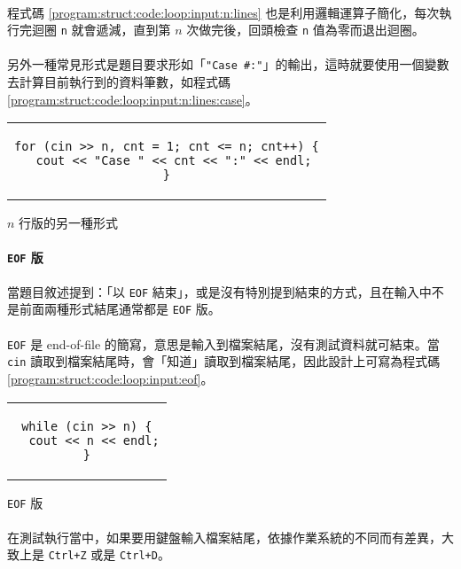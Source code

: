 \documentclass[12pt,a4paper,oneside]{article}
\begin{document}
\begin{CJK}{UTF8}{bkai}
\paragraph{}程式碼 \ref{program:struct:code:loop:input:n:lines} 也是利用邏輯運算子簡化，每次執行完迴圈 \lstinline!n! 就會遞減，直到第 $n$ 次做完後，回頭檢查 \lstinline!n! 值為零而退出迴圈。
\paragraph{}另外一種常見形式是題目要求形如「\lstinline!"Case #:"!」的輸出，這時就要使用一個變數去計算目前執行到的資料筆數，如程式碼 \ref{program:struct:code:loop:input:n:lines:case}。

\begin{code}[h!]
\centering
\begin{tabular}{c}
\begin{lstlisting}
for (cin >> n, cnt = 1; cnt <= n; cnt++) {
  cout << "Case " << cnt << ":" << endl;
}
\end{lstlisting}
\end{tabular}
\caption{$n$ 行版的另一種形式}
\label{program:struct:code:loop:input:n:lines:case}
\end{code}

\paragraph{\texttt{EOF} 版}當題目敘述提到：「以 \texttt{EOF} 結束」，或是沒有特別提到結束的方式，且在輸入中不是前面兩種形式結尾通常都是 \texttt{EOF} 版。
\paragraph{}\texttt{EOF} 是 end-of-file 的簡寫，意思是輸入到檔案結尾，沒有測試資料就可結束。當 \lstinline!cin! 讀取到檔案結尾時，會「知道」讀取到檔案結尾，因此設計上可寫為程式碼 \ref{program:struct:code:loop:input:eof}。

\begin{code}[h!]
\centering
\begin{tabular}{c}
\begin{lstlisting}
while (cin >> n) {
  cout << n << endl;
}
\end{lstlisting}
\end{tabular}
\caption{\texttt{EOF} 版}
\label{program:struct:code:loop:input:eof}
\end{code}

\paragraph{}在測試執行當中，如果要用鍵盤輸入檔案結尾，依據作業系統的不同而有差異，大致上是 \texttt{Ctrl+Z} 或是 \texttt{Ctrl+D}。


\end{CJK}
\end{document}
